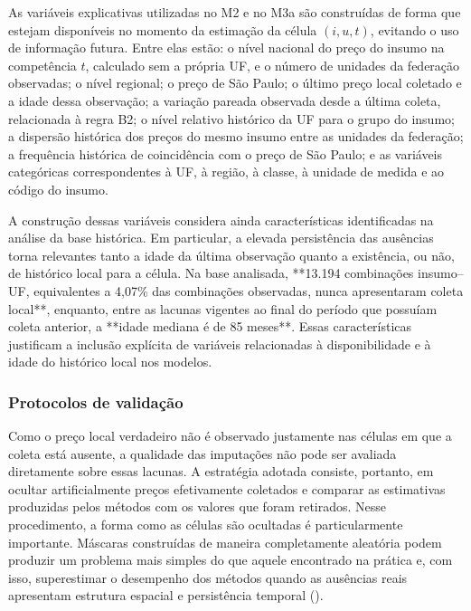 As variáveis explicativas utilizadas no M2 e no M3a são construídas de forma que estejam 
disponíveis no momento da estimação da célula \((i,u,t)\), evitando o uso de informação 
futura. Entre elas estão: o nível nacional do preço do insumo na competência \(t\), 
calculado sem a própria UF, e o número de unidades da federação observadas; o nível 
regional; o preço de São Paulo; o último preço local coletado e a idade dessa observação; 
a variação pareada observada desde a última coleta, relacionada à regra B2; o nível 
relativo histórico da UF para o grupo do insumo; a dispersão histórica dos preços do 
mesmo insumo entre as unidades da federação; a frequência histórica de coincidência com 
o preço de São Paulo; e as variáveis categóricas correspondentes à UF, à região, à classe, 
à unidade de medida e ao código do insumo.

A construção dessas variáveis considera ainda características identificadas na análise 
da base histórica. Em particular, a elevada persistência das ausências torna relevantes 
tanto a idade da última observação quanto a existência, ou não, de histórico local para 
a célula. Na base analisada, **13.194 combinações insumo–UF, equivalentes a 4,07\% das 
combinações observadas, nunca apresentaram coleta local**, enquanto, entre as lacunas 
vigentes ao final do período que possuíam coleta anterior, a **idade mediana é de 85 
meses**. Essas características justificam a inclusão explícita de variáveis relacionadas 
à disponibilidade e à idade do histórico local nos modelos.

\subsubsection{Protocolos de validação}


Como o preço local verdadeiro não é observado justamente nas células em que a coleta está ausente, a qualidade das 
imputações não pode ser avaliada diretamente sobre essas lacunas. A estratégia adotada consiste, portanto, em ocultar 
artificialmente preços efetivamente coletados e comparar as estimativas produzidas pelos métodos com os valores que 
foram retirados. Nesse procedimento, a forma como as células são ocultadas é particularmente importante. Máscaras construídas 
de maneira completamente aleatória podem produzir um problema mais simples do que aquele encontrado na prática e, com isso, 
superestimar o desempenho dos métodos quando as ausências reais apresentam estrutura espacial e persistência temporal 
().

